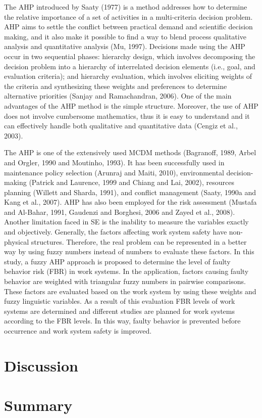 \documentclass[twocolumn]{article}
\begin{document}
The AHP introduced by Saaty (1977) is a method addresses how to determine the relative importance of a set of activities in a multi-criteria decision problem. AHP aims to settle the conflict between practical demand and scientific decision making, and it also make it possible to find a way to blend process qualitative analysis and quantitative analysis (Mu, 1997). Decisions made using the AHP occur in two sequential phases: hierarchy design, which involves decomposing the decision problem into a hierarchy of interrelated decision elements (i.e., goal, and evaluation criteria); and hierarchy evaluation, which involves eliciting weights of the criteria and synthesizing these weights and preferences to determine alternative priorities (Sanjay and Ramachandran, 2006). One of the main advantages of the AHP method is the simple structure. Moreover, the use of AHP does not involve cumbersome mathematics, thus it is easy to understand and it can effectively handle both qualitative and quantitative data (Cengiz et al., 2003).

The AHP is one of the extensively used MCDM methods (Bagranoff, 1989, Arbel and Orgler, 1990 and Moutinho, 1993). It has been successfully used in maintenance policy selection (Arunraj and Maiti, 2010), environmental decision-making (Patrick and Laurence, 1999 and Chiang and Lai, 2002), resources planning (Willett and Sharda, 1991), and conflict management (Saaty, 1990a and Kang et al., 2007). AHP has also been employed for the risk assessment (Mustafa and Al-Bahar, 1991, Gaudenzi and Borghesi, 2006 and Zayed et al., 2008).
Another limitation faced in SE is the inability to measure the variables exactly and objectively. Generally, the factors affecting work system safety have non-physical structures. Therefore, the real problem can be represented in a better way by using fuzzy numbers instead of numbers to evaluate these factors. In this study, a fuzzy AHP approach is proposed to determine the level of faulty behavior risk (FBR) in work systems. In the application, factors causing faulty behavior are weighted with triangular fuzzy numbers in pairwise comparisons. These factors are evaluated based on the work system by using these weights and fuzzy linguistic variables. As a result of this evaluation FBR levels of work systems are determined and different studies are planned for work systems according to the FBR levels. In this way, faulty behavior is prevented before occurrence and work system safety is improved.

\section{Discussion}
\section{Summary}

\cite{*}


\end{document}
